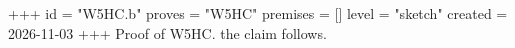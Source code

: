 +++
id = "W5HC.b"
proves = "W5HC"
premises = []
level = "sketch"
created = 2026-11-03
+++
Proof of W5HC. the claim follows.

